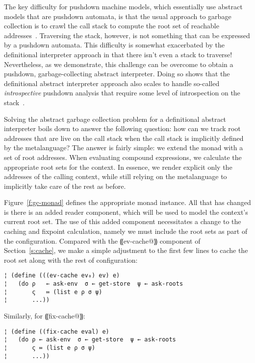 The key difficulty for pushdown machine models, which essentially use
abstract models that are pushdown automata, is that the usual approach
to garbage collection is to crawl the call stack to compute the root
set of reachable addresses~\cite{dvanhorn:Morrisett1995Abstract}.
Traversing the stack, however, is not something that can be expressed
by a pushdown automata.
%
This difficulty is somewhat exacerbated by the definitional
interpreter approach in that there isn't even a stack to traverse!
Nevertheless, as we demonstrate, this challenge can be overcome to
obtain a pushdown, garbage-collecting abstract interpreter.
%
Doing so shows that the definitional abstract interpreter approach
also scales to handle so-called \emph{introspective} pushdown analysis
that require some level of introspection on the
stack~\cite{dvanhorn:Earl2012Introspective,dvanhorn:Johnson2014Pushdown}.

Solving the abstract garbage collection problem for a definitional
abstract interpreter boils down to answer the following question: how
can we track root addresses that are live on the call stack when the
call stack is implicitly defined by the metalanguage?  The answer is
fairly simple: we extend the monad with a set of root addresses.  When
evaluating compound expressions, we calculate the appropriate root
sets for the context.  In essence, we render explicit only the
addresses of the calling context, while still relying on the
metalanguage to implicitly take care of the rest as before.

Figure~\ref{f:gc-monad} defines the appropriate monad instance.  All
that has changed is there is an added reader component, which will be
used to model the context's current root set.
%
The use of this added component necessitates a change to the caching
and fixpoint calculation, namely we must include the root sets as part
of the configuration.  Compared with the ⸨ev-cache@⸩ component of
Section~\ref{s:cache}, we make a simple adjustment to the first few
lines to cache the root set along with the rest of configuration:
\begin{lstlisting}
¦ (define (((ev-cache ev₀) ev) e)
¦   (do ρ   ← ask-env  σ ← get-store  ψ ← ask-roots
¦       ς   ≔ (list e ρ σ ψ)
¦       ...))
\end{lstlisting}
Similarly, for ⸨fix-cache@⸩:
\begin{lstlisting}
¦ (define ((fix-cache eval) e)  
¦   (do ρ ← ask-env  σ ← get-store  ψ ← ask-roots
¦       ς ≔ (list e ρ σ ψ)
¦       ...))
\end{lstlisting}


